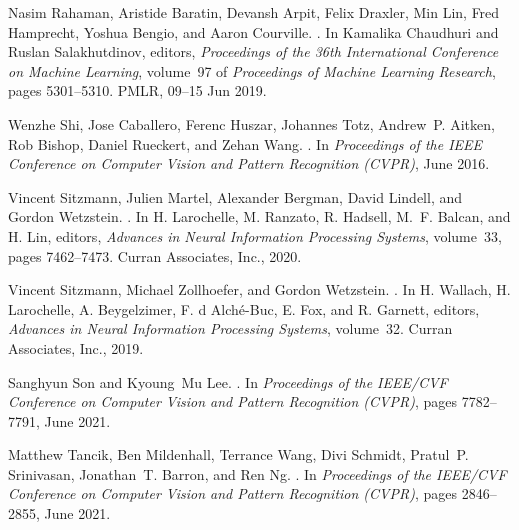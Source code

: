 \documentclass[10pt,twocolumn,letterpaper]{article}
\begin{document}
{\begin{thebibliography}{10}
Nasim Rahaman, Aristide Baratin, Devansh Arpit, Felix Draxler, Min Lin, Fred
  Hamprecht, Yoshua Bengio, and Aaron Courville.
.
\newblock In Kamalika Chaudhuri and Ruslan Salakhutdinov, editors, {\em
  Proceedings of the 36th International Conference on Machine Learning},
  volume~97 of {\em Proceedings of Machine Learning Research}, pages
  5301--5310. PMLR, 09--15 Jun 2019.

Wenzhe Shi, Jose Caballero, Ferenc Huszar, Johannes Totz, Andrew~P. Aitken, Rob
  Bishop, Daniel Rueckert, and Zehan Wang.
.
\newblock In {\em Proceedings of the IEEE Conference on Computer Vision and
  Pattern Recognition (CVPR)}, June 2016.

Vincent Sitzmann, Julien Martel, Alexander Bergman, David Lindell, and Gordon
  Wetzstein.
.
\newblock In H. Larochelle, M. Ranzato, R. Hadsell, M.~F. Balcan, and H. Lin,
  editors, {\em Advances in Neural Information Processing Systems}, volume~33,
  pages 7462--7473. Curran Associates, Inc., 2020.

Vincent Sitzmann, Michael Zollhoefer, and Gordon Wetzstein.
.
\newblock In H. Wallach, H. Larochelle, A. Beygelzimer, F. d\textquotesingle
  Alch\'{e}-Buc, E. Fox, and R. Garnett, editors, {\em Advances in Neural
  Information Processing Systems}, volume~32. Curran Associates, Inc., 2019.

Sanghyun Son and Kyoung~Mu Lee.
.
\newblock In {\em Proceedings of the IEEE/CVF Conference on Computer Vision and
  Pattern Recognition (CVPR)}, pages 7782--7791, June 2021.

Matthew Tancik, Ben Mildenhall, Terrance Wang, Divi Schmidt, Pratul~P.
  Srinivasan, Jonathan~T. Barron, and Ren Ng.
.
\newblock In {\em Proceedings of the IEEE/CVF Conference on Computer Vision and
  Pattern Recognition (CVPR)}, pages 2846--2855, June 2021.


\end{thebibliography}}
\end{document}
